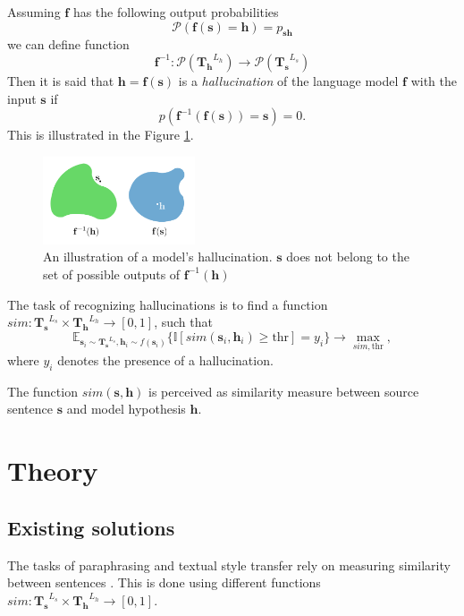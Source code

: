 \documentclass[11pt]{article}
\begin{document}
Assuming $\mathbf{f}$ has the following output probabilities \[\mathcal{P}(\mathbf{f}(\mathbf{s}) = \mathbf{h}) = p_{\mathbf{sh}}\]
we can define function \[\mathbf{f}^{-1}: \mathcal{P}(\mathbf{T_h}^{L_h}) \to \mathcal{P}(\mathbf{T_s}^{L_s})\]
Then it is said that $\mathbf{h} = \mathbf{f}(\mathbf{s})$ is a \textit{hallucination} of the language model $\mathbf{f}$ with the input $\mathbf{s}$ if \[p(\mathbf{f}^{-1}(\mathbf{f}(\mathbf{s})) = \mathbf{s}) = 0.\] This is illustrated in the Figure \ref{fig:hal}.

\begin{figure}
    \centering
    \includegraphics[width=0.4\textwidth]{images/hallucination.png}
    \caption{An illustration of a model's hallucination. $\mathbf{s}$ does not belong to the set of possible outputs of $\mathbf{f}^{-1}(\mathbf{h})$}
    \label{fig:hal}
\end{figure}

The task of recognizing hallucinations is to find a function $sim: \mathbf{T_s}^{L_s} \times \mathbf{T_h}^{L_h} \to [0, 1]$, such that
\[\mathbb{E}_{\mathbf{s}_i \sim \mathbf{T_s}^{L_s}, \mathbf{h}_i \sim f(\mathbf{s}_i)} \{\mathbb{I}[sim(\mathbf{s}_i, \mathbf{h}_i) \ge \text{thr}] = y_i \} \to \max\limits_{sim, \text{thr}},\]
where $y_i$ denotes the presence of a hallucination.

The function $sim(\mathbf{s}, \mathbf{h})$ is perceived as similarity measure between source sentence $\mathbf{s}$ and model hypothesis $\mathbf{h}$.

\section{Theory}

\subsection{Existing solutions}

The tasks of paraphrasing and textual style transfer rely on measuring similarity between sentences \cite{babakov-etal-2022-large}. This is done using different functions $sim: \mathbf{T_s}^{L_s} \times \mathbf{T_h}^{L_h} \to [0, 1]$.
\end{document}
